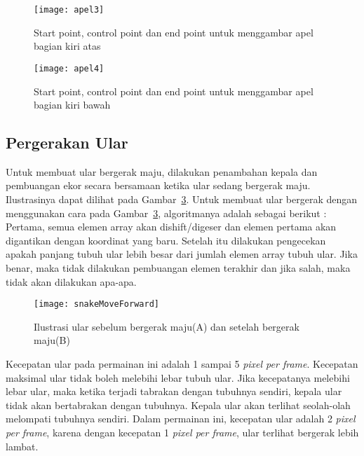 \begin{figure}[H]
	\centering  
	\texttt{[image: apel3]}  
	\caption[Start point, control point dan end point untuk menggambar apel bagian kiri atas]{Start point, control point dan end point untuk menggambar apel bagian kiri atas}
	\label{fig:apel3} 
\end{figure}

\begin{figure}[H]
	\centering  
	\texttt{[image: apel4]}  
	\caption[Start point, control point dan end point untuk menggambar apel bagian kiri bawah]{Start point, control point dan end point untuk menggambar apel bagian kiri bawah}
	\label{fig:apel4} 
\end{figure}

\subsection{Pergerakan Ular}
Untuk membuat ular bergerak maju, dilakukan penambahan kepala dan pembuangan ekor secara bersamaan ketika ular sedang bergerak maju. Ilustrasinya dapat dilihat pada Gambar~\ref{fig:snakeMoveForward}. Untuk membuat ular bergerak dengan menggunakan cara pada Gambar~\ref{fig:snakeMoveForward}, algoritmanya adalah sebagai berikut : Pertama, semua elemen array akan dishift/digeser dan elemen pertama akan digantikan dengan koordinat yang baru. Setelah itu dilakukan pengecekan apakah panjang tubuh ular lebih besar dari jumlah elemen array tubuh ular. Jika benar, maka tidak dilakukan pembuangan elemen terakhir dan jika salah, maka tidak akan dilakukan apa-apa. 

\begin{figure}[H]
	\centering  
	\texttt{[image: snakeMoveForward]}  
	\caption[Ilustrasi ular sebelum bergerak maju(A) dan setelah bergerak maju(B)]{Ilustrasi ular sebelum bergerak maju(A) dan setelah bergerak maju(B)}
	\label{fig:snakeMoveForward} 
\end{figure}

Kecepatan ular pada permainan ini adalah 1 sampai 5 \textit{pixel per frame}. Kecepatan maksimal ular tidak boleh melebihi lebar tubuh ular. Jika kecepatanya melebihi lebar ular, maka ketika terjadi tabrakan dengan tubuhnya sendiri, kepala ular tidak akan bertabrakan dengan tubuhnya. Kepala ular akan terlihat seolah-olah melompati tubuhnya sendiri. Dalam permainan ini, kecepatan ular adalah 2 \textit{pixel per frame}, karena dengan kecepatan 1 \textit{pixel per frame}, ular terlihat bergerak lebih lambat.\\

